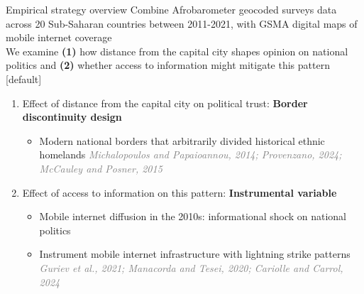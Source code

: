 \documentclass[10pt]{beamer}
\begin{document}
\begin{frame}{Empirical strategy overview}    
    \centering Combine Afrobarometer geocoded surveys data across 20 Sub-Saharan countries
between 2011-2021, with GSMA digital maps of mobile internet coverage\\\vfill
\vspace{1em}
    \centering We examine \textbf{(1)} how distance from the capital city shapes opinion on national politics and \textbf{(2)} whether access to information might mitigate this pattern \vfill  
    \vspace{1em}
    [default]
    \begin{enumerate}
        \item Effect of distance from the capital city on political trust: \textcolor{rougeprez}{\textbf{Border
        discontinuity design}} \vfill
        \begin{itemize}\setlength\itemsep{1em}

            \item Modern national borders that arbitrarily divided historical ethnic homelands \textcolor{gray}{\textit{Michalopoulos and Papaioannou, 2014; Provenzano, 2024; McCauley and Posner, 2015}}\vfill
        \end{itemize}

        \item Effect of access to information on this pattern: \textcolor{rougeprez}{\textbf{Instrumental variable}}\vfill
        \begin{itemize}\setlength\itemsep{1em}

        \item Mobile internet diffusion in the 2010s: informational shock on national politics \vfill
        \item Instrument mobile internet infrastructure with lightning strike patterns \textcolor{gray}{\textit{Guriev et al., 2021; Manacorda and Tesei, 2020; Cariolle and Carrol, 2024}}\vfill
    \end{itemize}

    \end{enumerate}
\end{frame}
\end{document}
